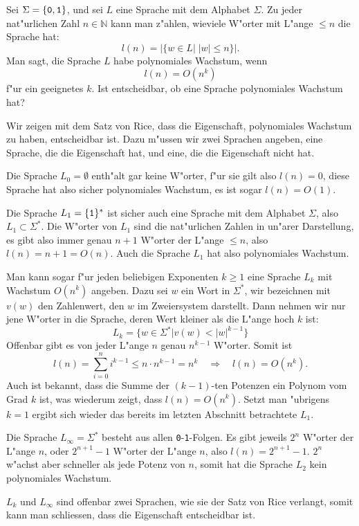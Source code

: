 Sei $\Sigma=\{\text{\tt 0},\text{\tt 1}\}$, und sei $L$ eine Sprache
mit dem Alphabet $\Sigma$. Zu jeder nat"urlichen Zahl $n\in\mathbb N$
kann man z"ahlen, wieviele W"orter mit L"ange $\le n$ die Sprache
hat:
\[
l(n)=|\{w\in L|\;|w|\le n\}|.
\]
Man sagt, die Sprache $L$ habe polynomiales Wachstum, wenn
\[
l(n)=O(n^k)
\]
f"ur ein geeignetes $k$. Ist entscheidbar, ob eine Sprache polynomiales
Wachstum hat?

\begin{loesung}
Wir zeigen mit dem Satz von Rice, dass die Eigenschaft, polynomiales
Wachstum zu haben, entscheidbar ist. Dazu m"ussen wir zwei Sprachen
angeben, eine Sprache, die die Eigenschaft hat, und eine, die die
Eigenschaft nicht hat.

Die Sprache $L_0=\emptyset$ enth"alt gar keine W"orter, f"ur sie
gilt also $l(n)=0$, diese Sprache hat also sicher polynomiales
Wachstum, es ist sogar $l(n)=O(1)$.

Die Sprache $L_1=\{\text{\tt 1}\}^*$ ist sicher auch eine Sprache mit
dem Alphabet $\Sigma$, also $L_1\subset \Sigma^*$. Die W"orter
von $L_1$ sind die nat"urlichen Zahlen in un"arer Darstellung,
es gibt also immer genau $n+1$ W"orter der L"ange $\le n$, also
$l(n)=n+1=O(n)$. Auch die Sprache $L_1$ hat also polynomiales Wachstum.

Man kann sogar f"ur jeden beliebigen Exponenten $k\ge 1$ eine Sprache $L_k$
mit Wachstum $O(n^k)$ angeben. Dazu sei $w$ ein Wort in $\Sigma^*$,
wir bezeichnen mit $v(w)$ den Zahlenwert, den $w$ im Zweiersystem
darstellt. Dann nehmen wir nur jene W"orter in die Sprache,
deren Wert kleiner als die L"ange hoch $k$ ist:
\[
L_k=\{ w\in\Sigma^*| v(w) < |w|^{k-1}\}
\]
Offenbar gibt es von jeder L"ange $n$ genau $n^{k-1}$ W"orter.
Somit ist
\[
l(n)=\sum_{i=0}^ni^{k-1}\le n\cdot n^{k-1}=n^k\quad\Rightarrow\quad l(n)=O(n^k).
\]
Auch ist bekannt, dass die Summe der $(k-1)$-ten Potenzen ein
Polynom vom Grad $k$ ist, was wiederum zeigt, dass $l(n)=O(n^k)$.
Setzt man "ubrigens $k=1$ ergibt
sich wieder das bereits im letzten Abschnitt betrachtete
$L_1$.

Die Sprache $L_\infty=\Sigma^*$ besteht aus allen {\tt 0}-{\tt 1}-Folgen.
Es gibt jeweils $2^n$ W"orter der L"ange $n$, oder $2^{n+1}-1$ W"orter
der L"ange $n$, also $l(n)=2^{n+1}-1$. $2^n$ w"achst aber schneller
als jede Potenz von $n$, somit hat die Sprache $L_2$ kein polynomiales
Wachstum.

$L_k$ und $L_\infty$ sind offenbar zwei Sprachen, wie sie der Satz von
Rice verlangt, somit kann man schliessen, dass die Eigenschaft
entscheidbar ist.
\end{loesung}

